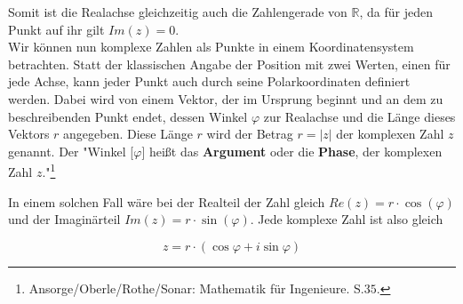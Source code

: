 \documentclass[a4paper,12pt]{article} %
\begin{document}
Somit ist die Realachse gleichzeitig auch die Zahlengerade von $\mathbb{R}$, da für jeden Punkt auf ihr gilt $Im(z)=0$.\\



Wir können nun komplexe Zahlen als Punkte in einem Koordinatensystem betrachten.
Statt der klassischen Angabe der Position mit zwei Werten, einen für jede Achse, kann jeder Punkt auch durch seine Polarkoordinaten definiert werden.
Dabei wird von einem Vektor, der im Ursprung beginnt und an dem zu beschreibenden Punkt endet, dessen Winkel $\varphi$ zur Realachse und die Länge dieses Vektors $r$ angegeben. Diese Länge $r$ wird der Betrag $r=|z|$ der komplexen Zahl $z$ genannt.
Der "Winkel [$\varphi$] heißt das \textbf{Argument} oder die \textbf{Phase}, der komplexen Zahl $z$."\footnote{Ansorge/Oberle/Rothe/Sonar: Mathematik für Ingenieure. S.$35$.}

In einem solchen Fall wäre bei der Realteil der Zahl gleich $Re(z)=r\cdot \cos(\varphi)$ und der Imaginärteil $Im(z)=r\cdot \sin(\varphi)$.
Jede komplexe Zahl ist also gleich

\begin{equation}\label{eq.trigon}
	\boxed{z=r\cdot(\cos\varphi+i \sin\varphi)}	
\end{equation}
\end{document}
